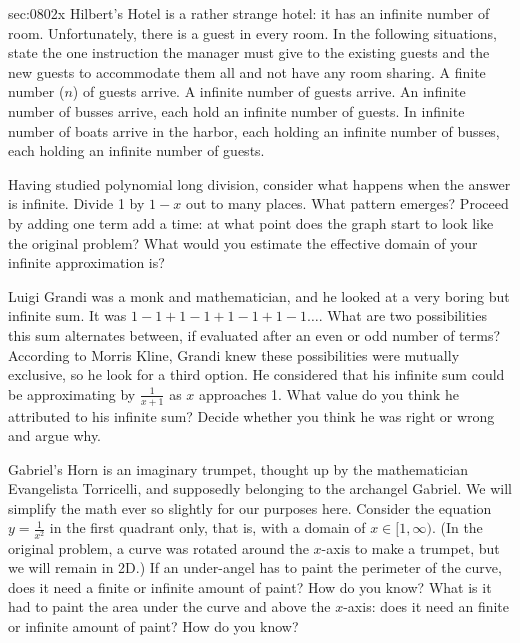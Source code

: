 \label{sec:0802x}
\begin{exercises}{sec:0802x}
\prob[0802Hotel] Hilbert's Hotel is a rather strange hotel: it has an infinite number of room.
Unfortunately, there is a guest in every room.
In the following situations, state the one instruction the manager must
give to the existing guests and the new guests to accommodate them all
and not have any room sharing.
\subprob A finite number ($n$) of guests arrive.
\subprob A infinite number of guests arrive.
\subprob An infinite number of busses arrive, each hold an infinite number of guests.
\subprob In infinite number of boats arrive in the harbor, each holding an infinite number of busses, each holding an infinite number of guests.


\prob[0802BFF]  Having studied polynomial long division, consider what 
happens when the answer is infinite.  Divide 1 by $1-x$ out to many places.  
What pattern emerges?  Proceed by adding one term add a time: at what point 
does the graph start to look like the original problem?  What would you estimate 
the effective domain of your infinite approximation is?


\prob[0802Grandi] Luigi Grandi was a monk and mathematician, and he looked 
at a very boring but infinite sum.  It was $1 - 1 + 1 - 1 + 1 - 1 + 1 -1 \dots$.  
What are two possibilities this sum alternates between, if evaluated after an
even or odd number of terms?  According to Morris Kline, Grandi knew these 
possibilities were mutually exclusive, so he look for a third option.  He considered 
that his infinite sum could be approximating by $\frac{1}{x+1}$ as $x$ approaches 1.  
What value do you think he attributed to his infinite sum?  Decide whether you 
think he was right or wrong and argue why.


\prob[0802Gabriel] Gabriel's Horn is an imaginary trumpet, thought up by the 
mathematician Evangelista  Torricelli, and supposedly belonging to the archangel Gabriel.  
We will simplify the math ever so slightly for our purposes here.  Consider the
equation $y=\frac{1}{x^2}$ in the first quadrant only, that is, with a domain of $x\in{[1,\infty)}$.
(In the original problem, a curve was rotated around the $x$-axis to make a trumpet, but
we will remain in 2D.)  If an under-angel has to paint the perimeter of the curve, does it
need a finite or infinite amount of paint?  How do you know?  What is it had to paint
the area under the curve and above the $x$-axis: does it need an finite or infinite amount
of paint?  How do you know?



\end{exercises}
